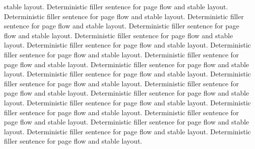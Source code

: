 \documentclass{article}
\begin{document}
stable layout. Deterministic filler sentence for page flow and stable layout. Deterministic filler sentence for page flow and stable layout. Deterministic filler sentence for page flow and stable layout. Deterministic filler sentence for page flow and stable layout. Deterministic filler sentence for page flow and stable layout. Deterministic filler sentence for page flow and stable layout. Deterministic filler sentence for page flow and stable layout. Deterministic filler sentence for page flow and stable layout. Deterministic filler sentence for page flow and stable layout. Deterministic filler sentence for page flow and stable layout. Deterministic filler sentence for page flow and stable layout. Deterministic filler sentence for page flow and stable layout. Deterministic filler sentence for page flow and stable layout. Deterministic filler sentence for page flow and stable layout. Deterministic filler sentence for page flow and stable layout. Deterministic filler sentence for page flow and stable layout. Deterministic filler sentence for page flow and stable layout. Deterministic filler sentence for page flow and stable layout. Deterministic filler sentence for page flow and stable layout. 
\end{document}
